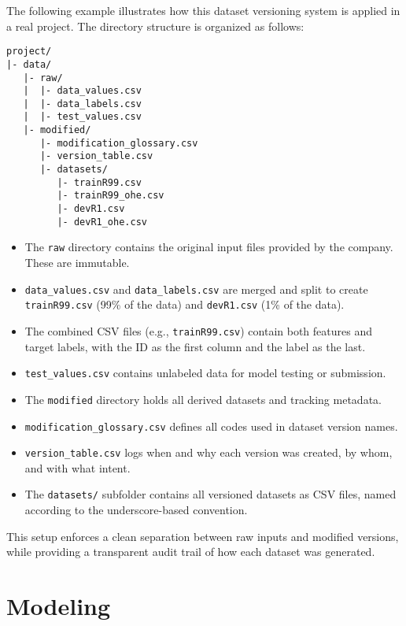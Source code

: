 \documentclass[12pt,openany]{book}
\begin{document}
The following example illustrates how this dataset versioning system is applied in a real project. The directory structure is organized as follows:

\begin{verbatim}
project/
|- data/
   |- raw/
   |  |- data_values.csv
   |  |- data_labels.csv
   |  |- test_values.csv
   |- modified/
      |- modification_glossary.csv
      |- version_table.csv
      |- datasets/
         |- trainR99.csv
         |- trainR99_ohe.csv
         |- devR1.csv
         |- devR1_ohe.csv
\end{verbatim}


\begin{itemize}
    \item The \texttt{raw} directory contains the original input files provided by the company. These are immutable.
    \item \texttt{data\_values.csv} and \texttt{data\_labels.csv} are merged and split to create \texttt{trainR99.csv} (99\% of the data) and \texttt{devR1.csv} (1\% of the data).
    \item The combined CSV files (e.g., \texttt{trainR99.csv}) contain both features and target labels, with the ID as the first column and the label as the last.
    \item \texttt{test\_values.csv} contains unlabeled data for model testing or submission.
    \item The \texttt{modified} directory holds all derived datasets and tracking metadata.
    \item \texttt{modification\_glossary.csv} defines all codes used in dataset version names.
    \item \texttt{version\_table.csv} logs when and why each version was created, by whom, and with what intent.
    \item The \texttt{datasets/} subfolder contains all versioned datasets as CSV files, named according to the underscore-based convention.
\end{itemize}

This setup enforces a clean separation between raw inputs and modified versions, while providing a transparent audit trail of how each dataset was generated.





\part{Modeling}
\end{document}
